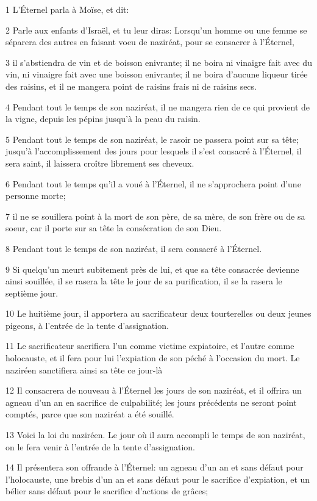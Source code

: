 \par 1 L'Éternel parla à Moïse, et dit:
\par 2 Parle aux enfants d'Israël, et tu leur diras: Lorsqu'un homme ou une femme se séparera des autres en faisant voeu de naziréat, pour se consacrer à l'Éternel,
\par 3 il s'abstiendra de vin et de boisson enivrante; il ne boira ni vinaigre fait avec du vin, ni vinaigre fait avec une boisson enivrante; il ne boira d'aucune liqueur tirée des raisins, et il ne mangera point de raisins frais ni de raisins secs.
\par 4 Pendant tout le temps de son naziréat, il ne mangera rien de ce qui provient de la vigne, depuis les pépins jusqu'à la peau du raisin.
\par 5 Pendant tout le temps de son naziréat, le rasoir ne passera point sur sa tête; jusqu'à l'accomplissement des jours pour lesquels il s'est consacré à l'Éternel, il sera saint, il laissera croître librement ses cheveux.
\par 6 Pendant tout le temps qu'il a voué à l'Éternel, il ne s'approchera point d'une personne morte;
\par 7 il ne se souillera point à la mort de son père, de sa mère, de son frère ou de sa soeur, car il porte sur sa tête la consécration de son Dieu.
\par 8 Pendant tout le temps de son naziréat, il sera consacré à l'Éternel.
\par 9 Si quelqu'un meurt subitement près de lui, et que sa tête consacrée devienne ainsi souillée, il se rasera la tête le jour de sa purification, il se la rasera le septième jour.
\par 10 Le huitième jour, il apportera au sacrificateur deux tourterelles ou deux jeunes pigeons, à l'entrée de la tente d'assignation.
\par 11 Le sacrificateur sacrifiera l'un comme victime expiatoire, et l'autre comme holocauste, et il fera pour lui l'expiation de son péché à l'occasion du mort. Le naziréen sanctifiera ainsi sa tête ce jour-là
\par 12 Il consacrera de nouveau à l'Éternel les jours de son naziréat, et il offrira un agneau d'un an en sacrifice de culpabilité; les jours précédents ne seront point comptés, parce que son naziréat a été souillé.
\par 13 Voici la loi du naziréen. Le jour où il aura accompli le temps de son naziréat, on le fera venir à l'entrée de la tente d'assignation.
\par 14 Il présentera son offrande à l'Éternel: un agneau d'un an et sans défaut pour l'holocauste, une brebis d'un an et sans défaut pour le sacrifice d'expiation, et un bélier sans défaut pour le sacrifice d'actions de grâces;
